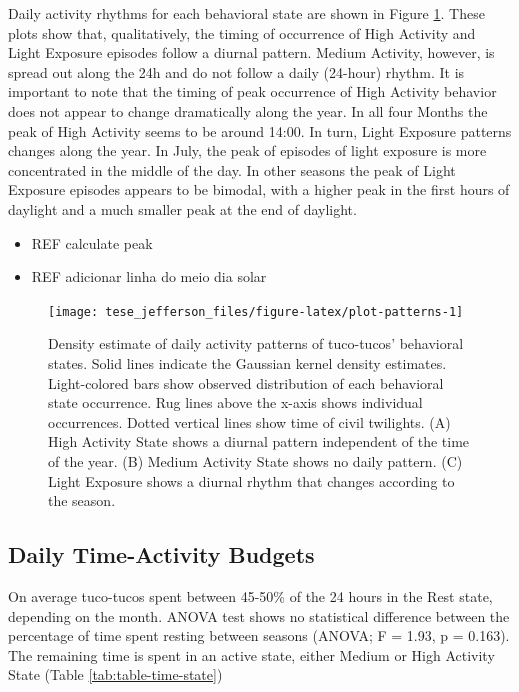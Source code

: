 \documentclass[english,msc,numbers,hidelinks]{coppe}
\providecommand{\tightlist}{%
  \setlength{\itemsep}{0pt}\setlength{\parskip}{0pt}}
\begin{document}
  Daily activity rhythms for each behavioral state are shown in Figure \ref{fig:plot-patterns}. These plots show that, qualitatively, the timing of occurrence of High Activity and Light Exposure episodes follow a diurnal pattern. Medium Activity, however, is spread out along the 24h and do not follow a daily (24-hour) rhythm. It is important to note that the timing of peak occurrence of High Activity behavior does not appear to change dramatically along the year. In all four Months the peak of High Activity seems to be around 14:00. In turn, Light Exposure patterns changes along the year. In July, the peak of episodes of light exposure is more concentrated in the middle of the day. In other seasons the peak of Light Exposure episodes appears to be bimodal, with a higher peak in the first hours of daylight and a much smaller peak at the end of daylight.
  \begin{itemize}
  \tightlist
  \item
    REF calculate peak
  \item
    REF adicionar linha do meio dia solar
  \end{itemize}
  \begin{figure}

  {\centering \texttt{[image: tese\_jefferson\_files/figure-latex/plot-patterns-1]} 

  }

  \caption{Density estimate of daily activity patterns of tuco-tucos' behavioral states. Solid lines indicate the Gaussian kernel density estimates. Light-colored bars show observed distribution of each behavioral state occurrence. Rug lines above the x-axis shows individual occurrences. Dotted vertical lines show time of civil twilights. (A) High Activity State shows a diurnal pattern independent of the time of the year. (B) Medium Activity State shows no daily pattern. (C) Light Exposure shows a diurnal rhythm that changes according to the season.}\label{fig:plot-patterns}
  \end{figure}
  \newpage

  \hypertarget{daily-time-activity-budgets}{%
  \subsection{Daily Time-Activity Budgets}\label{daily-time-activity-budgets}}

  On average tuco-tucos spent between 45-50\% of the 24 hours in the Rest state, depending on the month. ANOVA test shows no statistical difference between the percentage of time spent resting between seasons (ANOVA; F = 1.93, p = 0.163). The remaining time is spent in an active state, either Medium or High Activity State (Table \ref{tab:table-time-state})
\end{document}
